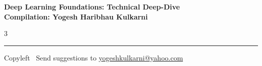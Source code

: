 \documentclass[8pt,landscape]{article}
\begin{document}
\footnotesize


\begin{center}
\Large{\textbf{Deep Learning Foundations: Technical Deep-Dive\\ Compilation: Yogesh Haribhau Kulkarni}}
\end{center}

\begin{multicols}{3}

\end{multicols}

\rule{\linewidth}{0.25pt}
\scriptsize
Copyleft \textcopyleft\  Send suggestions to
\href{http://www.yogeshkulkarni.com}{yogeshkulkarni@yahoo.com}
\end{document}
